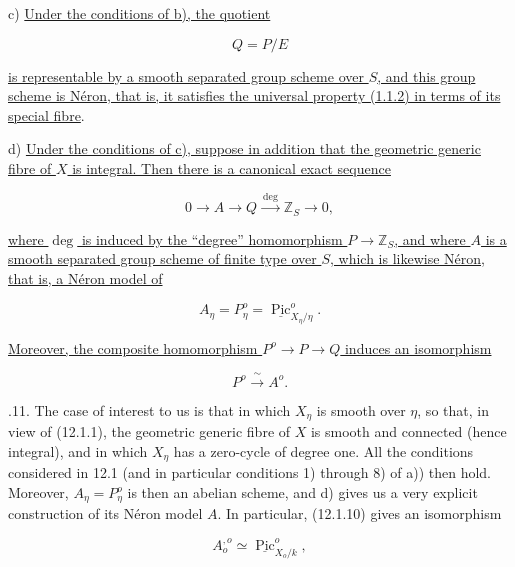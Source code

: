 \noindent
c) \underline{Under the conditions of b), the quotient}

\begin{equation}\tag{12.1.7}
 Q=P/E
\end{equation}

\noindent
\underline{is representable by a smooth separated group scheme over $S$,
and this group scheme is N\'eron, that is, it satisfies the universal
property (1.1.2) in terms of its special fibre}.

\medskip
\noindent
d) \underline{Under the conditions of c), suppose in addition that the
geometric generic fibre of $X$ is integral. Then there is a canonical
exact sequence}

\begin{equation}\tag{12.1.8}
 0\longrightarrow A\longrightarrow Q
   \xrightarrow{\ \deg\ }\mathbb Z_S\longrightarrow0,
\end{equation}

\noindent
\underline{where $\deg$ is induced by the ``degree'' homomorphism
$P\to\mathbb Z_S$, and where $A$ is a smooth separated group scheme of
finite type over $S$, which is likewise N\'eron, that is, a N\'eron model
of}

\begin{equation}\tag{12.1.9}
 A_\eta=P_\eta^o=
 \underline{\operatorname{Pic}}^o_{X_\eta/\eta}.
\end{equation}

\noindent
\underline{Moreover, the composite homomorphism $P^o\to P\to Q$ induces
an isomorphism}

\begin{equation}\tag{12.1.10}
 P^o\xrightarrow{\ \sim\ }A^o.
\end{equation}

\medskip
{}.11. The case of interest to us is that in which $X_\eta$ is smooth
over $\eta$, so that, in view of (12.1.1), the geometric generic fibre of
$X$ is smooth and connected (hence integral), and in which $X_\eta$ has a
zero-cycle of degree one. All the conditions considered in 12.1 (and in
particular conditions 1) through 8) of a)) then hold. Moreover,
$A_\eta=P_\eta^o$ is then an abelian scheme, and d) gives us a very
explicit construction of its N\'eron model $A$. In particular, (12.1.10)
gives an isomorphism

\begin{equation}\tag{12.1.12}
 A_o^{,o}\simeq\underline{\operatorname{Pic}}^o_{X_o/k},
\end{equation}

